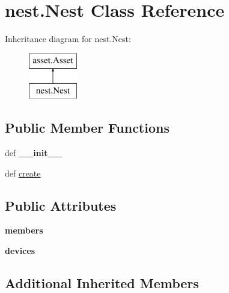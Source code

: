 \hypertarget{classnest_1_1_nest}{\section{nest.\-Nest Class Reference}
\label{classnest_1_1_nest}
}
Inheritance diagram for nest.\-Nest\-:\begin{figure}[H]
\begin{center}
\leavevmode
\includegraphics[height=2.000000cm]{classnest_1_1_nest}
\end{center}
\end{figure}
\subsection*{Public Member Functions}
\begin{DoxyCompactItemize}
\item 
\hypertarget{classnest_1_1_nest_a6ea507631915e9b1e54c1e091e19d63f}{def {\bfseries \-\_\-\-\_\-init\-\_\-\-\_\-}}\label{classnest_1_1_nest_a6ea507631915e9b1e54c1e091e19d63f}

\item 
def \hyperlink{classnest_1_1_nest_a3e9ae5e34ea2f5fe44d9a8f2e42822dc}{create}
\end{DoxyCompactItemize}
\subsection*{Public Attributes}
\begin{DoxyCompactItemize}
\item 
\hypertarget{classnest_1_1_nest_aa2a7d17fd5260f5b6bf96ead594b7029}{{\bfseries members}}\label{classnest_1_1_nest_aa2a7d17fd5260f5b6bf96ead594b7029}

\item 
\hypertarget{classnest_1_1_nest_a6ff95598ec58152e955ef1230fede31e}{{\bfseries devices}}\label{classnest_1_1_nest_a6ff95598ec58152e955ef1230fede31e}

\end{DoxyCompactItemize}
\subsection*{Additional Inherited Members}


